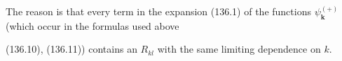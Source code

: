 The reason is that every term in the expansion (136.1) of the functions $\psi_{\mathbf{k}}^{(+)}$ (which occur in the formulas used above

(136.10), (136.11)) contains an $R_{kl}$ with the same limiting dependence on $k$.
